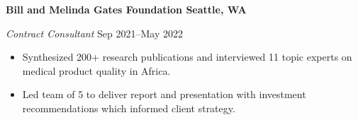 \textbf{Bill and Melinda Gates Foundation \hfill Seattle, WA}\par
\textit{Contract Consultant} \hfill Sep 2021--May 2022
\begin{itemize}
	\item Synthesized 200+ research publications and interviewed 11 topic experts on medical product quality in Africa.
	\item Led team of 5 to deliver report and presentation with investment recommendations which informed client strategy.
\end{itemize}\par